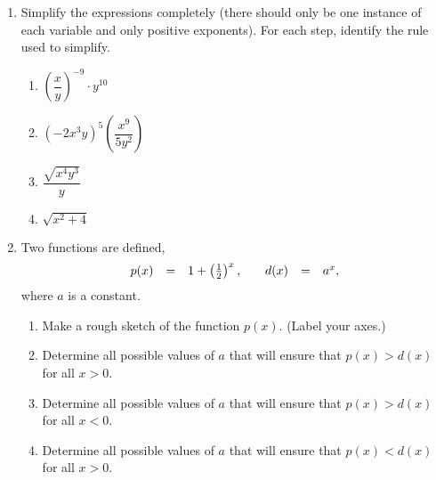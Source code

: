 \begin{enumerate}
\item Simplify the expressions completely (there should only be one
  instance of each variable and only positive exponents). For each
  step, identify the rule used to simplify.

\begin{enumerate}
\item $\left(\dfrac{x}{y}\right)^{-9}\cdot y^{10}$

  \vfill

\item $\left(-2x^3y\right)^5 \left(\dfrac{x^9}{5y^2}\right)$

  \vfill

\item $\dfrac{\sqrt{x^4y^3}}{y}$

  \vfill

\item $\sqrt{x^2+4}$

  \vfill

\end{enumerate}


\clearpage

\item Two functions are defined,
  \begin{equation*}
    \begin{array}{rcl@{\hspace{2em}}rcl}
      p(x) & = & 1 + \left(\frac{1}{2}\right)^x, & d(x) & = & a^x,
    \end{array}
  \end{equation*}
  where $a$ is a constant.
  \begin{enumerate}
  \item Make a rough sketch of the function $p(x)$. (Label your axes.)
    \vfill
  \item Determine all possible values of $a$ that will ensure that
    $p(x)>d(x)$ for all $x>0$.
    \vfill
  \item Determine all possible values of $a$ that will ensure that
    $p(x)>d(x)$ for all $x<0$.
    \vfill
  \item Determine all possible values of $a$ that will ensure that
    $p(x)<d(x)$ for all $x>0$.
    \vfill
  \end{enumerate}



\end{enumerate}



